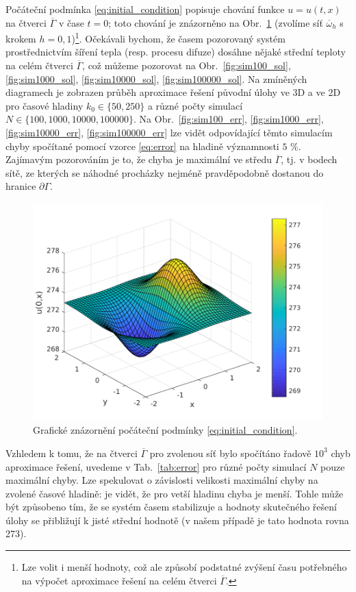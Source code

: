 \documentclass[11pt,american,czech]{article}
\newcommand*\midpoint[1]{\overline{#1}}
\begin{document}
Počáteční podmínka \eqref{eq:initial_condition} popisuje chování funkce $u=u(t,x)$ na čtverci $\midpoint{\Gamma}$ v čase $t=0$; toto chování je znázorněno na Obr.~\ref{fig:initial_condition} (zvolíme síť $\midpoint{\omega}_{h}$ s krokem $h=0,1$)\footnote{Lze volit i menší hodnoty, což ale způsobí podstatné zvýšení času potřebného na výpočet aproximace řešení na celém čtverci $\midpoint{\Gamma}$.}. Očekávali bychom, že časem pozorovaný systém prostřednictvím šíření tepla (resp. procesu difuze) dosáhne nějaké střední teploty na celém čtverci $\midpoint{\Gamma}$, což můžeme pozorovat na Obr.~\ref{fig:sim100_sol}, \ref{fig:sim1000_sol}, \ref{fig:sim10000_sol}, \ref{fig:sim100000_sol}. Na zmíněných diagramech je zobrazen průběh aproximace řešení původní úlohy ve 3D a ve 2D pro časové hladiny $k_{0}\in\{50,250\}$ a různé počty simulací $N\in\{100,1000,10000,100000\}$. Na Obr.~\ref{fig:sim100_err}, \ref{fig:sim1000_err}, \ref{fig:sim10000_err}, \ref{fig:sim100000_err} lze vidět odpovídající těmto simulacím chyby spočítané pomocí vzorce \eqref{eq:error} na hladině významnosti $5$ $\%$. Zajímavým pozorováním je to, že chyba je maximální ve středu $\midpoint{\Gamma}$, tj. v bodech sítě, ze kterých se náhodné procházky nejméně pravděpodobně dostanou do hranice $\partial\Gamma$.

\medskip

\begin{figure}[ht!]
\centering
\includegraphics[width=0.7\linewidth]{../results/initial_condition/initial_condition}
\caption{Grafické znázornění počáteční podmínky \eqref{eq:initial_condition}.}
\label{fig:initial_condition}
\end{figure}

Vzhledem k tomu, že na čtverci $\midpoint{\Gamma}$ pro zvolenou síť bylo spočítáno řadově $10^3$ chyb aproximace řešení, uvedeme v Tab.~\ref{tab:error} pro různé počty simulací $N$ pouze maximální chyby. Lze spekulovat o závislosti velikosti maximální chyby na zvolené časové hladině: je vidět, že pro vetší hladinu chyba je menší. Tohle může být způsobeno tím, že se systém časem stabilizuje a hodnoty skutečného řešení úlohy se přibližují k jisté střední hodnotě (v našem případě je tato hodnota rovna 273).
\end{document}
